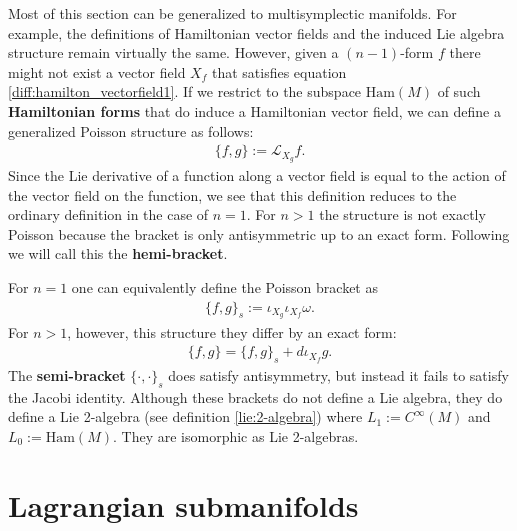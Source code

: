     \begin{remark}
        Most of this section can be generalized to multisymplectic manifolds. For example, the definitions of Hamiltonian vector fields and the induced Lie algebra structure remain virtually the same. However, given a $(n-1)$-form $f$ there might not exist a vector field $X_f$ that satisfies equation \ref{diff:hamilton_vectorfield1}. If we restrict to the subspace $\text{Ham}(M)$ of such \textbf{Hamiltonian forms} that do induce a Hamiltonian vector field, we can define a generalized Poisson structure as follows:
        \begin{gather}
            \{f, g\} := \mathcal{L}_{X_g}f.
        \end{gather}
        Since the Lie derivative of a function along a vector field is equal to the action of the vector field on the function, we see that this definition reduces to the ordinary definition in the case of $n=1$. For $n>1$ the structure is not exactly Poisson because the bracket is only antisymmetric up to an exact form. Following \cite{category_symplectic} we will call this the \textbf{hemi-bracket}.

        For $n=1$ one can equivalently define the Poisson bracket as
        \begin{gather}
            \{f,g\}_s := \iota_{X_g}\iota_{X_f}\omega.
        \end{gather}
        For $n>1$, however, this structure they differ by an exact form:
        \begin{gather}
            \{f,g\} = \{f,g\}_s + d\iota_{X_f}g.
        \end{gather}
        The \textbf{semi-bracket} $\{\cdot,\cdot\}_s$ does satisfy antisymmetry, but instead it fails to satisfy the Jacobi identity. Although these brackets do not define a Lie algebra, they do define a Lie 2-algebra (see definition \ref{lie:2-algebra}) where $L_1:=C^\infty(M)$ and $L_0:=\text{Ham}(M)$. They are isomorphic as Lie 2-algebras.
    \end{remark}

\section{Lagrangian submanifolds}


